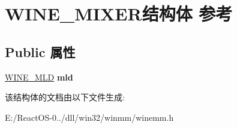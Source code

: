 \hypertarget{struct_w_i_n_e___m_i_x_e_r}{}\section{W\+I\+N\+E\+\_\+\+M\+I\+X\+E\+R结构体 参考}
\label{struct_w_i_n_e___m_i_x_e_r}
\subsection*{Public 属性}
\begin{DoxyCompactItemize}
\item 
\mbox{\label{struct_w_i_n_e___m_i_x_e_r_a1eda8d92dea6d92b4ed2150c6276eb7b}} 
\hyperlink{structtag_w_i_n_e___m_l_d}{W\+I\+N\+E\+\_\+\+M\+LD} {\bfseries mld}
\end{DoxyCompactItemize}


该结构体的文档由以下文件生成\+:\begin{DoxyCompactItemize}
\item 
E\+:/\+React\+O\+S-\/0../dll/win32/winmm/winemm.\+h\end{DoxyCompactItemize}
